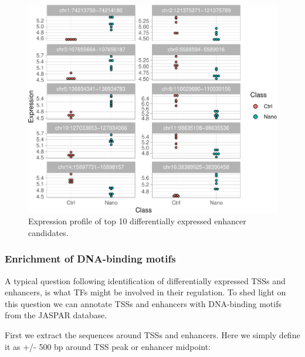 \documentclass[9pt,a4paper,]{extarticle}
\newenvironment{Shaded}{\begin{snugshade}}{\end{snugshade}}
\newcommand{\KeywordTok}[1]{\textcolor[rgb]{0.13,0.29,0.53}{\textbf{{#1}}}}
\newcommand{\DecValTok}[1]{\textcolor[rgb]{0.00,0.00,0.81}{{#1}}}
\newcommand{\StringTok}[1]{\textcolor[rgb]{0.31,0.60,0.02}{{#1}}}
\newcommand{\NormalTok}[1]{{#1}}
\begin{document}
\begin{figure}

{\centering \includegraphics{CAGEWorkflow_files/figure-latex/ploTop10-1} 

}

\caption{Expression profile of top 10 differentially expressed enhancer candidates.}\label{fig:ploTop10}
\end{figure}

\subsubsection{Enrichment of DNA-binding motifs}\label{enrichment-of-dna-binding-motifs}

A typical question following identification of differentially expressed TSSs and enhancers, is what TFs might be involved in their regulation. To shed light on this question we can annotate TSSs and enhancers with DNA-binding motifs from the JASPAR database\citep{Mathelier2016}.

First we extract the sequences around TSSs and enhancers. Here we simply define it as +/- 500 bp around TSS peak or enhancer midpoint:

\begin{Shaded}
\end{Shaded}
\end{document}
